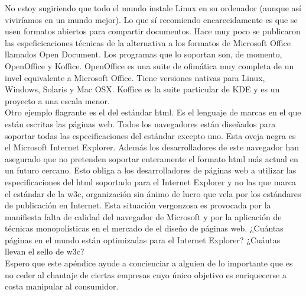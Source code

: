 No estoy sugiriendo que todo el mundo instale Linux en su ordenador
(aunque así viviríamos en un mundo mejor). Lo que sí recomiendo
encarecidamente es que se usen formatos abiertos para compartir
documentos. Hace muy poco se publicaron las espeficicaciones técnicas
de la alternativa a los formatos de Microsoft Office llamados Open
Document. Los programas que lo soportan son, de momento, OpenOffice y
Koffice. OpenOffice es una suite de ofimática muy completa de un invel
equivalente a Microsoft Office. Tiene versiones nativas para Linux,
Windows, Solaris y Mac OSX. Koffice es la suite particular de KDE y es
un proyecto a una
escala menor.\\


Otro ejemplo flagrante es el del estándar html. Es el lenguaje de
marcas en el que están escritas las páginas web. Todos los navegadores
están diseñados para soportar todas las especificaciones del estándar
excepto uno. Esta oveja negra es el Microsoft Internet Explorer.
Además los desarrolladores de este navegador han asegurado que no
pretenden soportar enteramente el formato html más actual en un futuro
cercano.  Esto obliga a los desarrolladores de páginas web a utilizar
las especificaciones del html soportado para el Internet Explorer y no
las que marca el estándar de la w3c, organización sin ánimo de lucro
que vela por los estándares de publicación en Internet. Esta situación
vergonzosa es provocada por la manifiesta falta de calidad del
navegador de Microsoft y por la aplicación de técnicas monopolísticas
en el mercado de el diseño de páginas web. ¿Cuántas páginas en el
mundo están optimizadas
para el Internet Explorer? ¿Cuántas llevan el sello de w3c?\\


Espero que este apéndice ayude a concienciar a alguien de lo
importante que es no ceder al chantaje de ciertas empresas cuyo único
objetivo es enriquecerse a costa manipular al consumidor.
